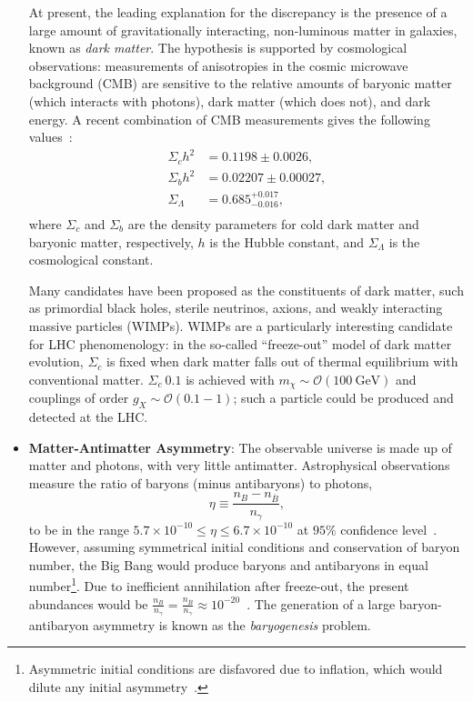 \begin{itemize}
	At present, the leading explanation for the discrepancy is the presence of a large amount of gravitationally interacting, non-luminous matter in galaxies, known as \emph{dark matter}. The hypothesis is supported by cosmological observations: measurements of anisotropies in the cosmic microwave background (CMB) are sensitive to the relative amounts of baryonic matter (which interacts with photons), dark matter (which does not), and dark energy. A recent combination of CMB measurements gives the following values~\cite{Ade:1530686}:
	\begin{align}
		\Sigma_{c}h^2 &= 0.1198 \pm 0.0026, \\
		\Sigma_{b}h^2 &= 0.02207 \pm 0.00027, \\
		\Sigma_{\Lambda} &= 0.685^{+0.017}_{-0.016}, \\
	\end{align}
	where $\Sigma_{c}$ and $\Sigma_{b}$ are the density parameters for cold dark matter and baryonic matter, respectively, $h$ is the Hubble constant, and $\Sigma_{\Lambda}$ is the cosmological constant. 

	Many candidates have been proposed as the constituents of dark matter, such as primordial black holes, sterile neutrinos, axions, and weakly interacting massive particles (WIMPs). WIMPs are a particularly interesting candidate for LHC phenomenology: in the so-called ``freeze-out'' model of dark matter evolution, $\Sigma_c$ is fixed when dark matter falls out of thermal equilibrium with conventional matter. $\Sigma_c~0.1$ is achieved with $m_{\chi}\sim \mathcal{O}(100~\mbox{GeV})$ and couplings of order $g_X\sim\mathcal{O}(0.1-1)$; such a particle could be produced and detected at the LHC. 

	\item \textbf{Matter-Antimatter Asymmetry}: The observable universe is made up of matter and photons, with very little antimatter. Astrophysical observations measure the ratio of baryons (minus antibaryons) to photons,
	\begin{equation}\label{eqn:baryon-photon-ratio}
		\eta \equiv \frac{n_B - n_{\overline{B}}}{n_{\gamma}}, 
	\end{equation}
	to be in the range $5.7\times 10^{-10} \leq \eta \leq 6.7\times 10^{-10}$ at $95\%$ confidence level~\cite{pdg-bbn}. However, assuming symmetrical initial conditions and conservation of baryon number, the Big Bang would produce baryons and antibaryons in equal number\footnote{Asymmetric initial conditions are disfavored due to inflation, which would dilute any initial asymmetry~\cite{cline}.}. Due to inefficient annihilation after freeze-out, the present abundances would be $\frac{n_B}{n_{\gamma}} = \frac{n_{\overline{B}}}{n_{\gamma}} \approx 10^{-20}$~\cite{cline}. The generation of a large baryon-antibaryon asymmetry is known as the \emph{baryogenesis} problem.


\end{itemize}
